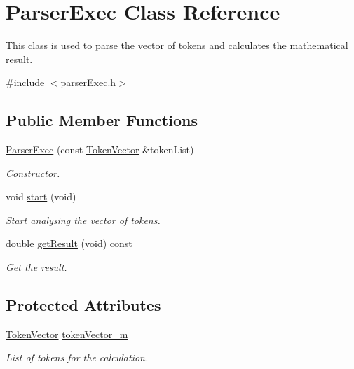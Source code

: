 \hypertarget{class_parser_exec}{}\section{Parser\+Exec Class Reference}
\label{class_parser_exec}


This class is used to parse the vector of tokens and calculates the mathematical result.  




{\ttfamily \#include $<$parser\+Exec.\+h$>$}

\subsection*{Public Member Functions}
\begin{DoxyCompactItemize}
\item 
\hyperlink{class_parser_exec_a865378c0f6a301dd4bffd870512167e2}{Parser\+Exec} (const \hyperlink{token_8h_a8318de25ae453e04997e41e88c9fad7d}{Token\+Vector} \&token\+List)
\begin{DoxyCompactList}\small\item\em Constructor. \end{DoxyCompactList}\item 
\hypertarget{class_parser_exec_aa00f3c5f1f4ea46e1c6aafebff8d4e9f}{}void \hyperlink{class_parser_exec_aa00f3c5f1f4ea46e1c6aafebff8d4e9f}{start} (void)\label{class_parser_exec_aa00f3c5f1f4ea46e1c6aafebff8d4e9f}

\begin{DoxyCompactList}\small\item\em Start analysing the vector of tokens. \end{DoxyCompactList}\item 
double \hyperlink{class_parser_exec_a795310e370db53f50dd44522568409fb}{get\+Result} (void) const 
\begin{DoxyCompactList}\small\item\em Get the result. \end{DoxyCompactList}\end{DoxyCompactItemize}
\subsection*{Protected Attributes}
\begin{DoxyCompactItemize}
\item 
\hypertarget{class_parser_exec_a56bfa666d473614fa26a484036897183}{}\hyperlink{token_8h_a8318de25ae453e04997e41e88c9fad7d}{Token\+Vector} \hyperlink{class_parser_exec_a56bfa666d473614fa26a484036897183}{token\+Vector\+\_\+m}\label{class_parser_exec_a56bfa666d473614fa26a484036897183}

\begin{DoxyCompactList}\small\item\em List of tokens for the calculation. \end{DoxyCompactList}\end{DoxyCompactItemize}


